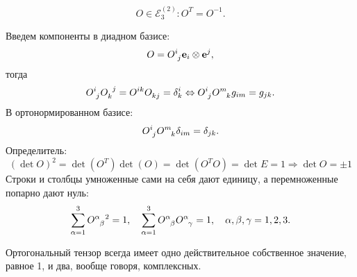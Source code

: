 \begin{definition}
	\begin{equation*}
		O\in\mathcal{E}_3^{(2)}\colon O^T=O^{-1}.
	\end{equation*}
\end{definition}
Введем компоненты в диадном базисе:
\begin{equation*}
	O = \tensor{O}{^i_j}\mathbf{e}_i\otimes\mathbf{e}^j,
\end{equation*}
тогда
\begin{equation*}
	\tensor{O}{^i_j}\tensor{O}{_k^j}=\tensor{O}{^i^k}\tensor{O}{_k_j}=\delta^i_k \Leftrightarrow
	\tensor{O}{^i_j}\tensor{O}{^m_k}g_{im}=g_{jk}.
\end{equation*}
В ортонормированном базисе:
\begin{equation*}
	\tensor{O}{^i_j}\tensor{O}{^m_k}\delta_{im}=\delta_{jk}.
\end{equation*}
Определитель:
\begin{equation*}
	\left(\det O\right)^2 = \det(O^T)\det(O) = \det(O^TO)=\det E = 1 \Rightarrow \det O = \pm1
\end{equation*}
Строки и столбцы умноженные сами на себя дают единицу, а перемноженные попарно дают нуль:
\begin{equation*}
	\sum_{\alpha=1}^{3}\tensor{O}{^\alpha_\beta}^2=1,\quad\sum_{\alpha=1}^{3}\tensor{O}{^\alpha_\beta}\tensor{O}{^\alpha_\gamma}=1,\quad \alpha,\beta,\gamma=1,2,3.
\end{equation*}

Ортогональный тензор всегда имеет одно действительное собственное значение, равное 1, и два, вообще говоря, комплексных.

